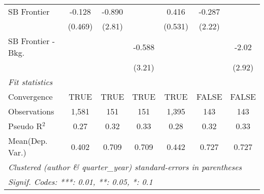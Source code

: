 \begin{tabular}{lcccccc}
   SB Frontier          & -0.128  & -0.890  &           & 0.416        & -0.287     &   \\   
                        & (0.469) & (2.81)  &           & (0.531)      & (2.22)     &   \\   
   SB Frontier - Bkg.   &         &         & -0.588    &              &            & -2.02\\   
                        &         &         & (3.21)    &              &            & (2.92)\\   
   \midrule
   \emph{Fit statistics}\\
   Convergence          &TRUE     & TRUE    & TRUE      & TRUE         & FALSE      & FALSE\\  
   Observations         & 1,581   & 151     & 151       & 1,395        & 143        & 143\\  
   Pseudo R$^2$         & 0.27    & 0.32    & 0.33      & 0.28         & 0.32       & 0.33\\  
Mean(Dep. Var.) & 0.402 & 0.709 & 0.709 & 0.442 & 0.727 & 0.727 \\
   \midrule \midrule
   \multicolumn{7}{l}{\emph{Clustered (author \& quarter\_year) standard-errors in parentheses}}\\
   \multicolumn{7}{l}{\emph{Signif. Codes: ***: 0.01, **: 0.05, *: 0.1}}\\
\end{tabular}
\par\endgroup
